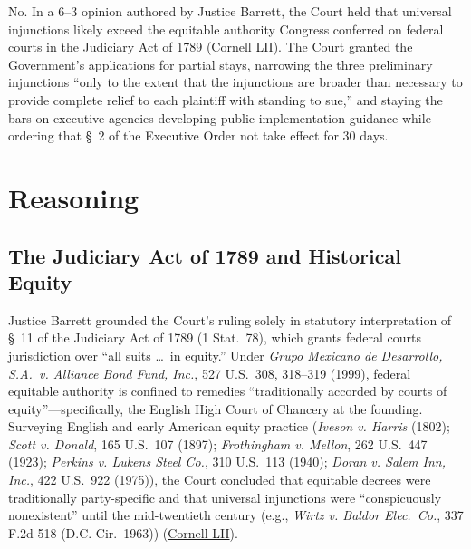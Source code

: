 \documentclass[12pt]{article}
\begin{document}
No. In a 6--3 opinion authored by Justice Barrett, the Court held that universal injunctions likely exceed the equitable authority Congress conferred on federal courts in the Judiciary Act of 1789 (\href{https://www.law.cornell.edu/supremecourt/text/24A884}{Cornell LII}). The Court granted the Government's applications for partial stays, narrowing the three preliminary injunctions ``only to the extent that the injunctions are broader than necessary to provide complete relief to each plaintiff with standing to sue,'' and staying the bars on executive agencies developing public implementation guidance while ordering that \S\ 2 of the Executive Order not take effect for 30 days.

\section{Reasoning}

\subsection{The Judiciary Act of 1789 and Historical Equity}
Justice Barrett grounded the Court's ruling solely in statutory interpretation of \S\ 11 of the Judiciary Act of 1789 (1 Stat.\ 78), which grants federal courts jurisdiction over ``all suits \ldots\ in equity.'' Under \textit{Grupo Mexicano de Desarrollo, S.A.\ v. Alliance Bond Fund, Inc.}, 527 U.S.\ 308, 318--319 (1999), federal equitable authority is confined to remedies ``traditionally accorded by courts of equity''---specifically, the English High Court of Chancery at the founding. Surveying English and early American equity practice (\textit{Iveson v. Harris} (1802); \textit{Scott v. Donald}, 165 U.S.\ 107 (1897); \textit{Frothingham v. Mellon}, 262 U.S.\ 447 (1923); \textit{Perkins v. Lukens Steel Co.}, 310 U.S.\ 113 (1940); \textit{Doran v. Salem Inn, Inc.}, 422 U.S.\ 922 (1975)), the Court concluded that equitable decrees were traditionally party-specific and that universal injunctions were ``conspicuously nonexistent'' until the mid-twentieth century (e.g., \textit{Wirtz v. Baldor Elec.\ Co.}, 337 F.2d 518 (D.C. Cir.\ 1963)) (\href{https://www.law.cornell.edu/supremecourt/text/24A884}{Cornell LII}).
\end{document}
